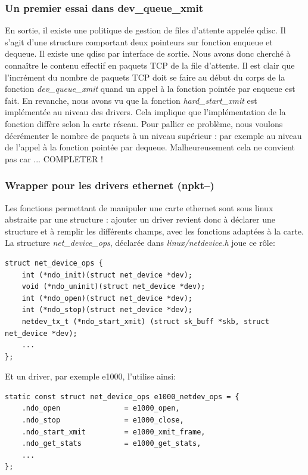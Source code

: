 \documentclass[a4paper]{article}
\begin{document}
\subsubsection{Un premier essai dans dev\_queue\_xmit}
En sortie, il existe une politique de gestion de files d'attente appelée qdisc. Il s'agit d'une structure 
comportant deux pointeurs sur fonction enqueue et dequeue. Il existe une qdisc par interface de sortie.
Nous avons donc cherché à connaître le contenu effectif en paquets TCP de la file d'attente.
Il est clair que l'incrément du nombre de paquets TCP doit se faire au début du corps de la fonction \textit{dev\_queue\_xmit}
quand un appel à la fonction pointée par enqueue est fait. En revanche, nous avons vu que la fonction 
\textit{hard\_start\_xmit} est implémentée au niveau des drivers. Cela implique que l'implémentation de la fonction 
diffère selon la carte réseau. Pour pallier ce problème, nous voulons décrémenter le nombre de paquets à un 
niveau supérieur : par exemple au niveau de l'appel à la fonction pointée par dequeue.
Malheureusement cela ne convient pas car ... COMPLETER !

\subsubsection{Wrapper pour les drivers ethernet (npkt--)}
Les fonctions permettant de manipuler une carte ethernet sont sous
linux abstraite par une structure : ajouter un driver revient donc
à déclarer une structure et à remplir les différents champs, avec
les fonctions adaptées à la carte.
La structure \textit{net\_device\_ops}, déclarée dans
\textit{linux/netdevice.h} joue ce rôle:
\begin{verbatim}
struct net_device_ops {
    int (*ndo_init)(struct net_device *dev);
    void (*ndo_uninit)(struct net_device *dev);
    int (*ndo_open)(struct net_device *dev);
    int (*ndo_stop)(struct net_device *dev);
    netdev_tx_t (*ndo_start_xmit) (struct sk_buff *skb, struct net_device *dev);
    ...
};
\end{verbatim}

Et un driver, par exemple e1000, l'utilise ainsi:
\begin{verbatim}
static const struct net_device_ops e1000_netdev_ops = {
    .ndo_open               = e1000_open,
    .ndo_stop               = e1000_close,
    .ndo_start_xmit         = e1000_xmit_frame,
    .ndo_get_stats          = e1000_get_stats,
    ...
};
\end{verbatim}
\end{document}

